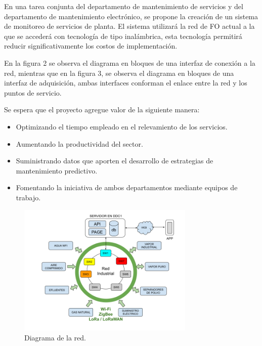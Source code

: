 \documentclass[
11pt%
]{charter}
\begin{document}
En una tarea conjunta del departamento de mantenimiento de servicios y del departamento de mantenimiento electrónico, se propone la creación de un sistema de monitoreo de servicios de planta. El sistema utilizará la red de FO actual a la que se accederá con tecnología de tipo inalámbrica, esta tecnología permitirá reducir significativamente los costos de implementación.

En la figura 2 se observa el diagrama en bloques de una interfaz de conexión a la red, mientras que en la figura 3, se observa el diagrama en bloques de una interfaz de adquisición, ambas interfaces conforman el enlace entre la red y los puntos de servicio. 

Se espera que el proyecto agregue valor de la siguiente manera:
\begin{itemize}
	\item Optimizando el tiempo empleado en el relevamiento de los servicios.
	\item Aumentando la productividad del sector.
	\item Suministrando datos que aporten el desarrollo de estrategias de mantenimiento predictivo.
	\item Fomentando la iniciativa de ambos departamentos mediante equipos de trabajo.
\end{itemize}



\begin{figure}[htpb]
\centering 
\includegraphics[width=0.75\textwidth]{./Figuras/diagrama_red_cel.png}
\caption{Diagrama de la red.}
\label{fig:diagBloques}
\end{figure}
\end{document}
